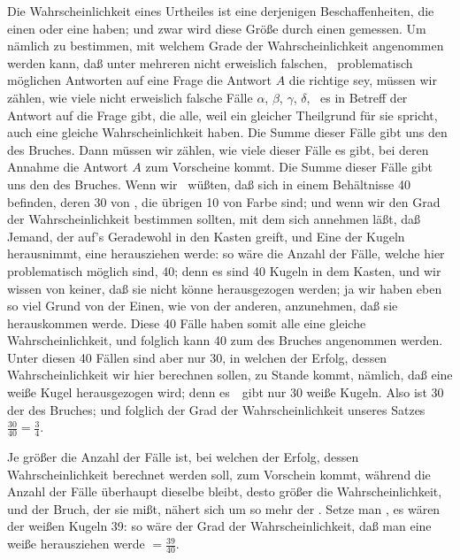 \begin{aufza}
\item Die Wahrscheinlichkeit eines Urtheiles ist eine derjenigen Beschaffenheiten, die einen  oder eine  haben; und zwar wird diese Größe durch einen  gemessen. Um nämlich zu bestimmen, mit welchem Grade der Wahrscheinlichkeit angenommen werden kann, daß unter mehreren nicht erweislich falschen, \dh\ problematisch möglichen Antworten auf eine Frage die Antwort $A$ die richtige sey, müssen wir zählen, wie viele nicht erweislich falsche Fälle $\alpha$, $\beta$, $\gamma$, $\delta$, \usf\ es in Betreff der Antwort auf die Frage gibt, die alle, weil ein gleicher Theilgrund für sie spricht, auch eine gleiche Wahrscheinlichkeit haben. Die Summe dieser Fälle gibt uns den  des Bruches. Dann müssen wir zählen, wie viele dieser Fälle es gibt, bei deren Annahme die Antwort $A$ zum Vorscheine kommt. Die Summe dieser Fälle gibt uns den  des Bruches. Wenn wir \zB\ wüßten, daß sich in einem Behältnisse 40  befinden, deren 30 von , die übrigen 10 von  Farbe sind; und wenn wir den Grad der Wahrscheinlichkeit bestimmen sollten, mit dem sich annehmen läßt, daß Jemand, der auf's Geradewohl in den Kasten greift, und Eine der Kugeln herausnimmt, eine  herausziehen werde: so wäre die Anzahl der Fälle, welche hier  problematisch möglich sind, 40; denn es sind 40 Kugeln in dem Kasten, und wir wissen von keiner, daß sie nicht könne herausgezogen werden; ja wir haben eben so viel Grund von der Einen, wie von der anderen, anzunehmen, daß sie herauskommen werde. Diese 40 Fälle haben somit alle eine gleiche Wahrscheinlichkeit, und folglich kann 40 zum  des Bruches angenommen werden. Unter diesen 40 Fällen sind aber nur 30, in welchen der Erfolg, dessen Wahrscheinlichkeit wir hier berechnen sollen, zu Stande kommt, nämlich, daß eine weiße Kugel herausgezogen wird; denn es~\ gibt nur 30 weiße Kugeln. Also ist 30 der  des Bruches; und folglich der Grad der Wahrscheinlichkeit unseres Satzes $\frac{30}{40} = \frac{3}{4}$.
\item Je größer die Anzahl der Fälle ist, bei welchen der Erfolg, dessen Wahrscheinlichkeit berechnet werden soll, zum Vorschein kommt, während die Anzahl der Fälle überhaupt dieselbe bleibt, desto größer die Wahrscheinlichkeit, und der Bruch, der sie mißt, nähert sich um so mehr der . Setze man \zB , es wären der weißen Kugeln 39: so wäre der Grad der Wahrscheinlichkeit, daß man eine weiße herausziehen werde $= \frac{39}{40}$.

\end{aufza}
